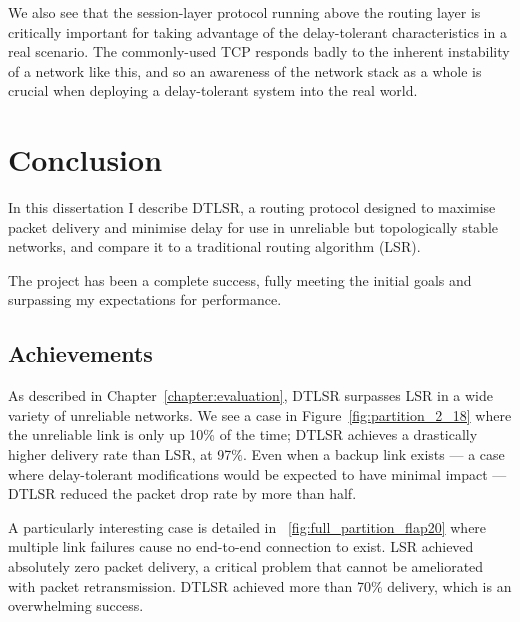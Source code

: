 \documentclass[withindex,glossary,openany]{cam-thesis}
\begin{document}
We also see that the session-layer protocol running above the routing layer is critically important for taking advantage of the delay-tolerant characteristics in a real scenario. The commonly-used TCP responds badly to the inherent instability of a network like this, and so an awareness of the network stack as a whole is crucial when deploying a delay-tolerant system into the real world.

\chapter{Conclusion}

In this dissertation I describe DTLSR, a routing protocol designed to maximise packet delivery and minimise delay for use in unreliable but topologically stable networks, and compare it to a traditional routing algorithm (LSR).

The project has been a complete success, fully meeting the initial goals and surpassing my expectations for performance.

\section{Achievements}

As described in Chapter~\ref{chapter:evaluation}, DTLSR surpasses LSR in a wide variety of unreliable networks. We see a case in Figure~\ref{fig:partition_2_18} where the unreliable link is only up 10\% of the time; DTLSR achieves a drastically higher delivery rate than LSR, at 97\%. Even when a backup link exists --- a case where delay-tolerant modifications would be expected to have minimal impact --- DTLSR reduced the packet drop rate by more than half.

A particularly interesting case is detailed in ~\ref{fig:full_partition_flap20} where multiple link failures cause no end-to-end connection to exist. LSR achieved absolutely zero packet delivery, a critical problem that cannot be ameliorated with packet retransmission. DTLSR achieved more than 70\% delivery, which is an overwhelming success.
\end{document}
